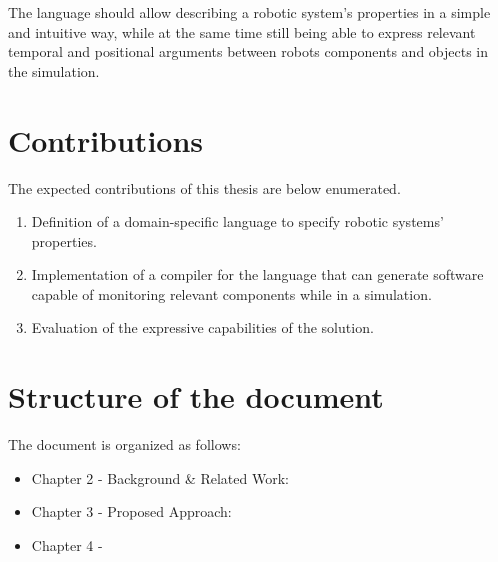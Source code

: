 The language should allow describing a robotic system's properties in a simple and intuitive way, while at the same time still being able to express relevant temporal and positional arguments between robots components and objects in the simulation.


\section{Contributions}
\label{sec:contributions}

The expected contributions of this thesis are below enumerated.

\begin{enumerate}
    \item Definition of a domain-specific language to specify robotic systems' properties.
    \item Implementation of a compiler for the language that can generate software capable of monitoring relevant components while in a simulation.
    \item Evaluation of the expressive capabilities of the solution.
\end{enumerate}

\section{Structure of the document}
\label{sec:structure}

The document is organized as follows:

\begin{itemize}
    \item Chapter 2 - Background \& Related Work:
    \item Chapter 3 - Proposed Approach:
    \item Chapter 4 -
\end{itemize}
